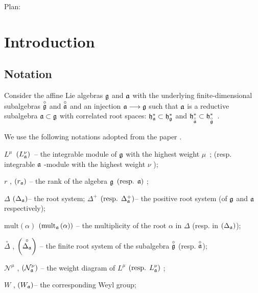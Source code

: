 \documentclass[a4paper,12pt]{article}
\theoremstyle{definition} \newtheorem{Def}{Definition}
\begin{document}
Plan:

\section{Introduction}
\label{sec:introduction}

\subsection{Notation}
\label{sec:notation}

Consider the affine Lie algebras $\frak{g}$ and $\frak{a}$ with the
underlying finite-dimensional subalgebras $\overset{\circ }{\frak{g}}$ and $%
\overset{\circ }{\frak{a}}$ and an injection $\frak{a}\longrightarrow \frak{g%
}$ such that $\frak{a}$ is a reductive subalgebra $\frak{a\subset g}$ with
correlated root spaces: $\frak{h}_{\frak{a}}^{\ast }\subset \frak{h}_{\frak{g%
}}^{\ast }$ and $\frak{h}_{\overset{\circ }{\frak{a}}}^{\ast }\subset \frak{h%
}_{\overset{\circ }{\frak{g}}}^{\ast }$\ .

We use the following notations adopted from the paper \cite{ilyin812pbc}.

$L^{\mu }$\ $\left( L_{\frak{a}}^{\nu }\right) $\ -- the integrable module
of $\frak{g}$ with the highest weight $\mu $\ ; (resp. integrable $\frak{a}$
-module with the highest weight $\nu $ );

$r$ , $\left( r_{\frak{a}}\right) $ -- the rank of the algebra $\frak{g}$ $%
\left( \text{resp. }\frak{a}\right) $ ;

$\Delta $ $\left( \Delta _{\frak{a}}\right) $-- the root system; $\Delta
^{+} $ $\left( \text{resp. }\Delta _{\frak{a}}^{+}\right) $-- the positive
root system (of $\frak{g}$ and $\frak{a}$ respectively);

$\mathrm{mult}\left( \alpha \right) $ $\left( \mathrm{mult}_{\frak{a}}\left(
\alpha \right) \right) $ -- the multiplicity of the root $\alpha$ in $\Delta 
$ (resp. in $\left( \Delta _{\frak{a}}\right) $);

$\overset{\circ }{\Delta }$ , $\left( \overset{\circ }{\Delta _{\frak{a}}}%
\right) $ -- the finite root system of the subalgebra $\overset{\circ }{%
\frak{g}}$ (resp. $\overset{\circ }{\frak{a}}$);

$\mathcal{N}^{\mu }$ , $\left( \mathcal{N}_{\frak{a}}^{\nu }\right) $ -- the
weight diagram of $L^{\mu }$ $\left( \text{resp. }L_{\frak{a}}^{\nu }\right) 
$ ;

$W$ , $\left( W_{\frak{a}}\right) $-- the corresponding Weyl group;
\end{document}
